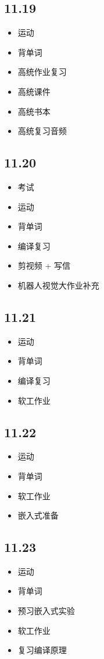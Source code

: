 \documentclass[UTF8]{ctexart}
\begin{document}
\subsection*{11.19}
\begin{itemize}
    \item 运动
    \item 背单词
    \item 高统作业复习
    \item 高统课件
    \item 高统书本
    \item 高统复习音频
\end{itemize}

\subsection*{11.20}
\begin{itemize}
    \item 考试
    \item 运动
    \item 背单词
    \item 编译复习
    \item 剪视频 + 写信
    \item 机器人视觉大作业补充
\end{itemize}

\subsection*{11.21}
\begin{itemize}
    \item 运动
    \item 背单词
    \item 编译复习
    \item 软工作业
\end{itemize}

\subsection*{11.22}
\begin{itemize}
    \item 运动
    \item 背单词
    \item 软工作业
    \item 嵌入式准备
\end{itemize}

\subsection*{11.23}
\begin{itemize}
    \item 运动
    \item 背单词
    \item 预习嵌入式实验
    \item 软工作业
    \item 复习编译原理
\end{itemize}
\end{document}

